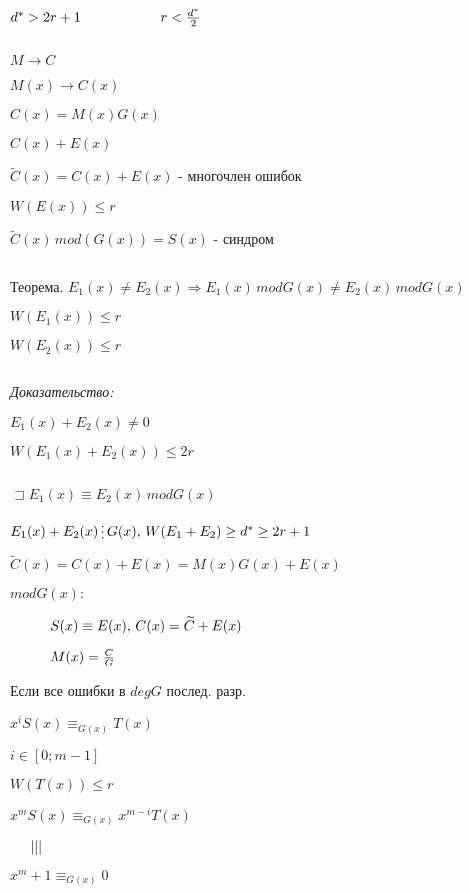\documentclass[12pt]{article}
\begin{document}
    $d^* > 2r+1 \hspace{2 cm} r < \frac{d^*}{2}$\par
    $ $\par
    $M \to C$\par
    $M(x) \to C(x)$\par
    $C(x) = M(x)G(x)$\par
    $C(x)+E(x)$\par
    $\widetilde{C}(x)= C(x)+E(x)$ - многочлен ошибок\par
    \textit{$W(E(x)) \leq r$}\par
    $\widetilde{C}(x) \, mod(G(x))=S(x)$ - синдром \par
    $ $\par
    Теорема. $E_1(x) \neq E_2(x) \Rightarrow E_1(x) \, mod G(x) \neq E_2(x) \, mod G(x)$\par
    $W(E_1(x)) \leq r$\par
    $W(E_2(x)) \leq r$\par
    $ $\par
    \textit{Доказательство:}\par
    $E_1(x) + E_2(x) \neq 0$\par
    $W(E_1(x)+E_2(x)) \leq 2r$\par
    $ $\par
    $\sqsupset E_1(x) \equiv E_2(x) \, mod G(x)$\par
    $E_1(x)+E_2(x) \mathop{\raisebox{-2pt}{\vdots}} G(x), \, W(E_1+E_2) \geq d^* \geq 2r+1$\par
    $\widetilde{C}(x)=C(x)+E(x) = M(x)G(x)+E(x)$\par
    $mod G(x):$\par
    $\hspace{1 cm} S(x) \equiv E(x), \, C(x) = \widetilde{C}+E(x)$\par
    $\hspace{1 cm} M(x) = \frac{C}{G}$\par
    Если все ошибки в $deg G$ послед.  разр.\par
    $x^i S(x) \equiv_{G(x)}T(x)$\par
    $i \in [0;m-1]$\par
    $W(T(x)) \leq r$\par
    $x^mS(x) \equiv_{G(x)} x^{m-i}T(x)$\par
    $\hspace{5 mm} |||$\par
    $x^m+1 \equiv_{G(x)}0$\par
    $ $\par
\end{document}
